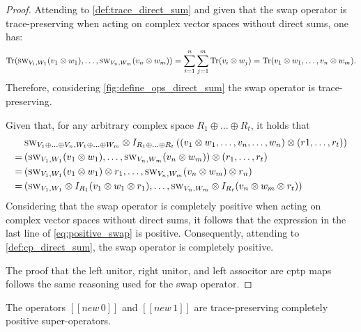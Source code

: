 \begin{proof}
  Attending to \autoref{def:trace_direct_sum} and given that the swap operator is trace-preserving when acting on complex vector spaces without direct sums, one has:
  \begin{equation}
    \text{Tr}  (\textsc{sw}_{V_1,W_1} (v_{1}\otimes w_{1}), \ldots, \textsc{sw}_{V_n,W_m}(v_n\otimes w_{m})) = \sum_{i=1}^{n}\sum_{j=1}^{m} \text{Tr}(v_i \otimes w_j) =  \text{Tr} (v_{1}\otimes w_{1}, \ldots,v_n\otimes w_{m}).
  \end{equation}
  Therefore, considering \autoref{fig:define_ops_direct_sum} the swap operator is trace-preserving. 

  Given that, for any arbitrary complex space $R_1 \oplus \ldots \oplus R_t $, it holds that
  \begin{equation} \label{eq:positive_swap}
  \begin{split}
    &\textsc{sw}_{V_1 \oplus \ldots \oplus V_n, W_1\oplus \ldots \oplus W_m} \otimes I_{R_1 \oplus \ldots \oplus R_t} \left((v_1 \otimes w_1, \ldots, v_n, \ldots, w_n) \otimes (r1, \ldots, r_t)\right) \\
    = \hspace{2pt} & (\textsc{sw}_{V_1, W_1}(v_{1}\otimes w_{1}), \ldots, \textsc{sw}_{V_n,W_m}(v_n\otimes w_{m})) \otimes (r_1, \ldots, r_t) \\
    = \hspace{2pt}  & (\textsc{sw}_{V_1, W_1}(v_{1}\otimes w_{1}) \otimes r_1, \ldots, \textsc{sw}_{V_n,W_m}(v_n\otimes w_{m}) \otimes r_n) \\  
    = \hspace{2pt} & (\textsc{sw}_{V_1, W_1} \otimes I_{R_1} (v_{1}\otimes w_{1} \otimes r_1), \ldots, \textsc{sw}_{V_n,W_m} \otimes I_{R_t}(v_n\otimes w_{m} \otimes r_t)) 
  \end{split}
  \end{equation}
 Considering that the swap operator is completely positive when acting on complex vector spaces without direct sums, it follows that the expression in the last line of \autoref{eq:positive_swap} is positive. Consequently, attending to \autoref{def:cp_direct_sum}, the swap operator is completely positive.

  The proof that the left unitor, right unitor, and left associtor are \acrshort{cptp} maps follows the same reasoning used for the swap operator.
\end{proof}

\begin{proposition} \label{prop:q_cptp}
  The operators $[\![\textit{new} \, 0 ]\!]$ and $[\![\textit{new} \, 1 ]\!]$  are trace-preserving completely positive super-operators.
\end{proposition}

